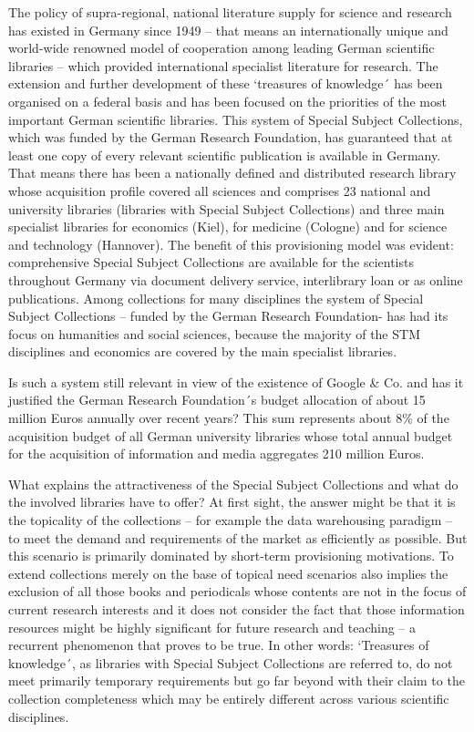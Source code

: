 \documentclass[a4paper,
fontsize=11pt,
oneside,
numbers=noperiodatend,
parskip=half-,
bibliography=totoc,
final
]{scrartcl}
\begin{document}
The policy of supra-regional, national literature supply for science and
research has existed in Germany since 1949 -- that means an
internationally unique and world-wide renowned model of cooperation
among leading German scientific libraries -- which provided
international specialist literature for research. The extension and
further development of these `treasures of knowledge´ has been organised
on a federal basis and has been focused on the priorities of the most
important German scientific libraries. This system of Special Subject
Collections, which was funded by the German Research Foundation, has
guaranteed that at least one copy of every relevant scientific
publication is available in Germany. That means there has been a
nationally defined and distributed research library whose acquisition
profile covered all sciences and comprises 23 national and university
libraries (libraries with Special Subject Collections) and three main
specialist libraries for economics (Kiel), for medicine (Cologne) and
for science and technology (Hannover). The benefit of this provisioning
model was evident: comprehensive Special Subject Collections are
available for the scientists throughout Germany via document delivery
service, interlibrary loan or as online publications. Among collections
for many disciplines the system of Special Subject Collections -- funded
by the German Research Foundation- has had its focus on humanities and
social sciences, because the majority of the STM disciplines and
economics are covered by the main specialist libraries.

Is such a system still relevant in view of the existence of Google \&
Co. and has it justified the German Research Foundation´s budget
allocation of about 15 million Euros annually over recent years? This
sum represents about 8\% of the acquisition budget of all German
university libraries whose total annual budget for the acquisition of
information and media aggregates 210 million Euros.

What explains the attractiveness of the Special Subject Collections and
what do the involved libraries have to offer? At first sight, the answer
might be that it is the topicality of the collections -- for example the
data warehousing paradigm -- to meet the demand and requirements of the
market as efficiently as possible. But this scenario is primarily
dominated by short-term provisioning motivations. To extend collections
merely on the base of topical need scenarios also implies the exclusion
of all those books and periodicals whose contents are not in the focus
of current research interests and it does not consider the fact that
those information resources might be highly significant for future
research and teaching -- a recurrent phenomenon that proves to be true.
In other words: `Treasures of knowledge´, as libraries with Special
Subject Collections are referred to, do not meet primarily temporary
requirements but go far beyond with their claim to the collection
completeness which may be entirely different across various scientific
disciplines.
\end{document}
